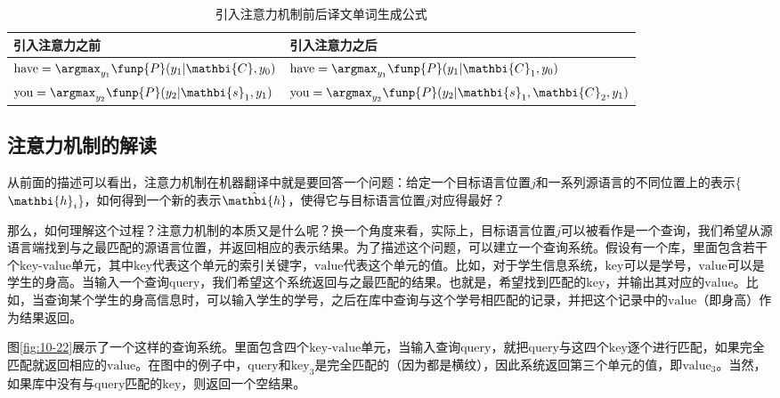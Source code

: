 \begin{table}[htp]
\centering
\caption{引入注意力机制前后译文单词生成公式}
\label{tab:10-7}
\begin{tabular}{ l | l }
\rule{0pt}{13pt}	引入注意力之前			&引入注意力之后 \\ \hline
\rule{0pt}{16pt}	$\textrm{have} = \argmax_{y_1}  \funp{P} (y_1 | \mathbi{C} , y_0)$		&$\textrm{have} = \argmax_{y_1}  \funp{P} (y_1 | \mathbi{C}_1 , y_0)$	\\
\rule{0pt}{16pt}	$\textrm{you} = \argmax_{y_2} \funp{P} (y_2 | \mathbi{s}_1 , y_1)$			&$\textrm{you} = \argmax_{y_2} \funp{P} (y_2 | \mathbi{s}_1, \mathbi{C}_2 , y_1)$	\\
\end{tabular}
\end{table}

\subsection{注意力机制的解读}
\label{sec:10.1.4}

\vspace{0.5em}
\parinterval 从前面的描述可以看出，注意力机制在机器翻译中就是要回答一个问题：给定一个目标语言位置$j$和一系列源语言的不同位置上的表示\{${\mathbi{h}_i}$\}，如何得到一个新的表示$\hat{\mathbi{h}}$，使得它与目标语言位置$j$对应得最好？

\parinterval 那么，如何理解这个过程？注意力机制的本质又是什么呢？换一个角度来看，实际上，目标语言位置$j$可以被看作是一个查询，我们希望从源语言端找到与之最匹配的源语言位置，并返回相应的表示结果。为了描述这个问题，可以建立一个查询系统。假设有一个库，里面包含若干个$\mathrm{key}$-$\mathrm{value}$单元，其中$\mathrm{key}$代表这个单元的索引关键字，$\mathrm{value}$代表这个单元的值。比如，对于学生信息系统，$\mathrm{key}$可以是学号，$\mathrm{value}$可以是学生的身高。当输入一个查询$\mathrm{query}$，我们希望这个系统返回与之最匹配的结果。也就是，希望找到匹配的$\mathrm{key}$，并输出其对应的$\mathrm{value}$。比如，当查询某个学生的身高信息时，可以输入学生的学号，之后在库中查询与这个学号相匹配的记录，并把这个记录中的$\mathrm{value}$（即身高）作为结果返回。

\parinterval 图\ref{fig:10-22}展示了一个这样的查询系统。里面包含四个$\mathrm{key}$-$\mathrm{value}$单元，当输入查询$\mathrm{query}$，就把$\mathrm{query}$与这四个$\mathrm{key}$逐个进行匹配，如果完全匹配就返回相应的$\mathrm{value}$。在图中的例子中，$\mathrm{query}$和$\mathrm{key}_3$是完全匹配的（因为都是横纹），因此系统返回第三个单元的值，即$\mathrm{value}_3$。当然，如果库中没有与$\mathrm{query}$匹配的$\mathrm{key}$，则返回一个空结果。

